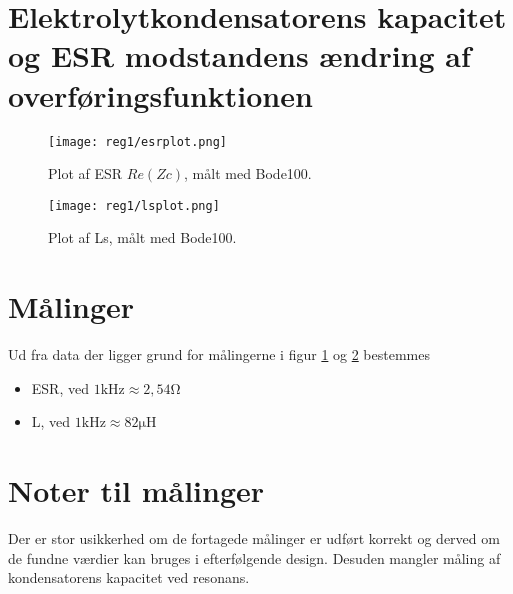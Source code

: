 \section{Elektrolytkondensatorens kapacitet og ESR modstandens ændring af overføringsfunktionen}\label{sec:spm4}

\begin{figure}[h!]
	\centering
	\texttt{[image: reg1/esrplot.png]}
	\caption{Plot af ESR $Re(Zc)$, målt med Bode100.}
	\label{fig:esrplot}
\end{figure}
\FloatBlock

\begin{figure}[h!]
	\centering
	\texttt{[image: reg1/lsplot.png]}
	\caption{Plot af Ls, målt med Bode100.}
	\label{fig:lsplot}
\end{figure}
\FloatBlock
\section*{Målinger}
Ud fra data der ligger grund for målingerne i figur \ref{fig:esrplot} og \ref{fig:lsplot} bestemmes
\begin{itemize}
	\item ESR, ved $1 \si{\kilo\hertz} \approx 2,54 \si{\ohm}$
	\item L, ved $1 \si{\kilo\hertz} \approx 82 \si{\micro\henry}$
\end{itemize} 

\section*{Noter til målinger}
Der er stor usikkerhed om de fortagede målinger er udført korrekt og derved om de fundne værdier kan bruges i efterfølgende design.
Desuden mangler måling af kondensatorens kapacitet ved resonans.

